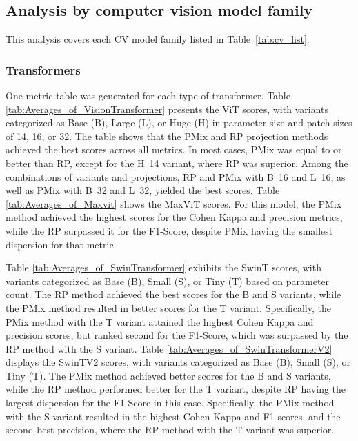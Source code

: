 \subsection{Analysis by computer vision model family}
 
This analysis covers each \gls{CV} model family listed in Table~\ref{tab:cv_list}.
 
\subsubsection{Transformers}

One metric table was generated for each type of transformer.
Table \ref{tab:Averages_of_VisionTransformer} presents the \gls{ViT} scores, with variants categorized as Base (B), Large (L), or Huge (H) in parameter size and patch sizes of 14, 16, or 32. The table shows that the \gls{PMix} and \gls{RP} projection methods achieved the best scores across all metrics. In most cases, \gls{PMix} was equal to or better than \gls{RP}, except for the \mbox{H 14} variant, where \gls{RP} was superior. Among the combinations of variants and projections, \gls{RP} and \gls{PMix} with \mbox{B 16} and \mbox{L 16}, as well as \gls{PMix} with \mbox{B 32} and \mbox{L 32}, yielded the best scores.
Table \ref{tab:Averages_of_Maxvit} shows the \gls{MaxViT} scores.  For this model, the \gls{PMix} method achieved the highest scores for the Cohen Kappa and precision metrics, while the \gls{RP} surpassed it for the F1-Score, despite \gls{PMix} having the smallest dispersion for that metric.

Table \ref{tab:Averages_of_SwinTransformer} exhibits the \gls{SwinT} scores, with variants categorized as Base (B), Small (S), or Tiny (T) based on parameter count. The \gls{RP} method achieved the best scores for the B and S variants, while the \gls{PMix} method resulted in better scores for the T variant. Specifically, the \gls{PMix} method with the T variant attained the highest Cohen Kappa and precision scores, but ranked second for the F1-Score, which was surpassed by the \gls{RP} method with the S variant.
Table \ref{tab:Averages_of_SwinTransformerV2} displays the \gls{SwinTV2} scores, with variants categorized as Base (B), Small (S), or Tiny (T). The \gls{PMix} method achieved better scores for the B and S variants, while the \gls{RP} method performed better for the T variant, despite \gls{RP} having the largest dispersion for the F1-Score in this case. Specifically, the \gls{PMix} method with the S variant resulted in the highest Cohen Kappa and F1 scores, and the second-best precision, where the \gls{RP} method with the T variant was superior.


